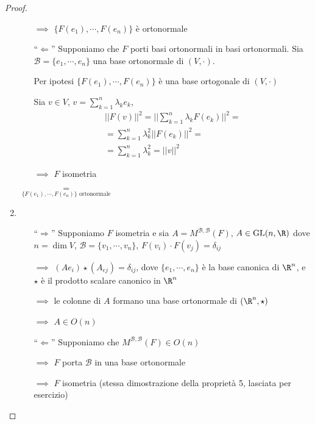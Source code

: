 \begin{proof}
\begin{enumerate}
\begin{itemize}
        $\implies$ $ \{F(e_1), \cdots, F(e_{n} )\} $ è ortonormale
        \item [``$\Leftarrow$''] Supponiamo che $ F $ porti basi ortonormali in basi ortonormali. Sia $ \mathscr{B}=\{e_1, \cdots, e_{n} \} $ una base ortonormale di $ (V, \cdot ) $. 
        
        Per ipotesi $ \{F(e_1), \cdots, F(e_{n} )\} $ è una base ortogonale di $ (V, \cdot ) $

        Sia $ v \in V $, $ v=\sum_{k=1}^{n} \lambda_{k} e_{k} $, \begin{multline*} ||F(v)||^{2}=||\sum_{k=1}^{n} \lambda_{k} F(e_{k})||^{2}=\\=\sum_{k=1}^{n} \lambda^{2}_k ||F(e_{k} )||^{2}=\\
        =\sum_{k=1}^{n} \lambda_{k}^{2}=||v||^{2}  \end{multline*} 
        
        $\implies$ $ F $ isometria
    \end{itemize}
    $\underset{\{F(e_1), \cdots, F(e_{n} )\}\text{ ortonormale}}{=}$ %
    \item \begin{itemize}
        \item [``$\Rightarrow$''] Supponiamo $ F $ isometria e sia $ A=M^{ \mathscr{B}, \mathscr{B}}(F) $, $ A \in \text{GL}(n, \R) $ dove $ n = \dim V $, $ \mathscr{B}=\{v_1, \cdots, v_{n} \} $, $ F(v_{i} ) \cdot F(v_{j}) =\delta_{ij} $
        
        $ \implies $ $ (Ae_{i} ) \star (A_{ej} )=\delta_{ij}  $, dove $ \{e_1, \cdots, e_{n} \} $ è la base canonica di $ \R^{n} $, e $ \star  $ è il prodotto scalare canonico in $ \R^{n} $

        $ \implies $ le colonne di $ A $ formano una base ortonormale di $ (\R^{n}, \star) $ 

        $ \implies $ $A \in O(n)$

        \item [``$\Leftarrow$''] Supponiamo che $ M^{ \mathscr{B}, \mathscr{B}}(F) \in O(n)$ 
        
        $\implies$ $ F $ porta $ \mathscr{B} $ in una base ortonormale 
        
        $\implies$ $ F $ isometria (stessa dimostrazione della proprietà 5, lasciata per esercizio)
    \end{itemize}
\end{enumerate}
\end{proof}
